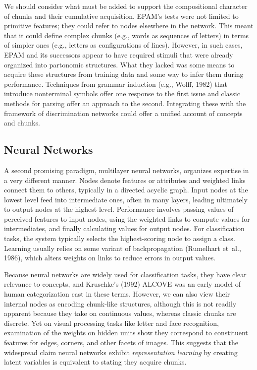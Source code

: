 \documentclass[11pt,letterpaper]{article}
\begin{document}
We should consider what must be added to support the compositional
character of chunks and their cumulative acquisition. EPAM's tests
were not limited to primitive features; they could refer to nodes
elsewhere in the network. This meant that it could define complex chunks
(e.g., words as sequences of letters) in terms of simpler ones (e.g.,
letters as configurations of lines). However, in such cases, EPAM 
and its successors appear to have required stimuli that were already
organized into partonomic structures. What they lacked was some means
to acquire these structures from training data and some way to infer
them during performance. Techniques from grammar induction (e.g., Wolff,
1982) that introduce nonterminal symbols offer one response to the 
first issue and classic methods for parsing offer an approach to the 
second. Integrating these with the framework of discrimination networks 
could offer a unified account of concepts and chunks.

\vspace{-0.04in}
\subsection{Neural Networks}

A second promising paradigm, multilayer neural networks, organizes 
expertise in a very different manner. Nodes denote features or
attributes and weighted links connect them to others, typically
in a directed acyclic graph. Input nodes at the lowest level feed
into intermediate ones, often in many layers, leading ultimately
to output nodes at the highest level. Performance involves passing
values of perceived features to input nodes, using the weighted links
to compute values for intermediates, and finally calculating values 
for output nodes. For classification tasks, the system typically
selects the highest-scoring node to assign a class. Learning usually
relies on some variant of backpropagation (Rumelhart et~al., 1986),
which alters weights on links to reduce errors in output values.

Because neural networks are widely used for classification tasks,
they have clear relevance to concepts, and Kruschke's (1992) ALCOVE
was an early model of human categorization cast in these terms.
However, we can also view their internal nodes as encoding chunk-like
structures, although this is not readily apparent because they take on
continuous values, whereas classic chunks are discrete. Yet on visual 
processing tasks like letter and face recognition, examination of the
weights on hidden units show they correspond to constituent features 
for edges, corners, and other facets of images. This suggests that
the widespread claim neural networks exhibit {\it representation
learning\/} by creating latent variables is equivalent to stating
they acquire chunks. 
\end{document}
